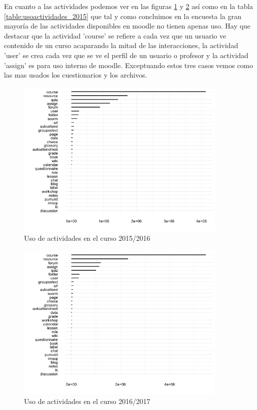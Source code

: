 En cuanto a las actividades podemos ver en las figuras \ref{fig:usoactividades_2015} y \ref{fig:usoactividades_2016} así como en la tabla \ref{table:usoactividades_2015} que tal y como concluimos en la encuesta la gran mayoría de las actividades disponibles en moodle no tienen apenas uso. Hay que destacar que la actividad 'course' se refiere a cada vez que un usuario ve contenido de un curso acaparando la mitad de las interacciones, la actividad 'user' se crea cada vez que se ve el perfil de un usuario o profesor y la actividad 'assign' es para uso interno de moodle. Exceptuando estos tres casos vemos como las mas usados los cuestionarios y los archivos.

\begin{figure}[H]
\centering
\includegraphics[width=0.9\textwidth]{../r/usoactividades_2015}
\caption{Uso de actividades en el curso 2015/2016}
\label{fig:usoactividades_2015}
\end{figure}

\begin{figure}[H]
\centering
\includegraphics[width=0.9\textwidth]{../r/usoactividades_2016}
\caption{Uso de actividades en el curso 2016/2017}
\label{fig:usoactividades_2016}
\end{figure}

